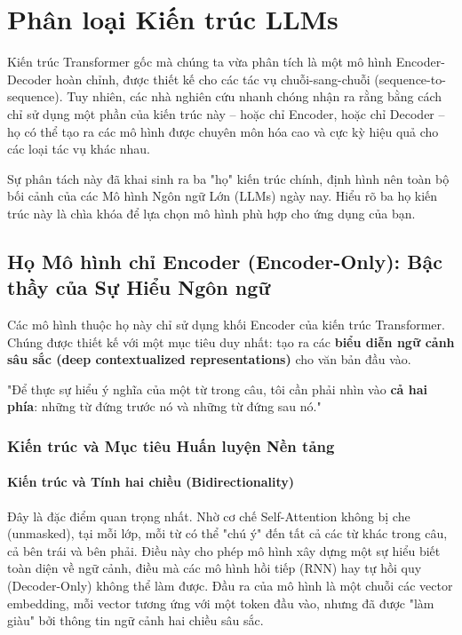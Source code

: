 
\section{Phân loại Kiến trúc LLMs}
\label{sec:llm_architectures_classification}

Kiến trúc Transformer gốc mà chúng ta vừa phân tích là một mô hình Encoder-Decoder hoàn chỉnh, được thiết kế cho các tác vụ chuỗi-sang-chuỗi (sequence-to-sequence). Tuy nhiên, các nhà nghiên cứu nhanh chóng nhận ra rằng bằng cách chỉ sử dụng một phần của kiến trúc này -- hoặc chỉ Encoder, hoặc chỉ Decoder -- họ có thể tạo ra các mô hình được chuyên môn hóa cao và cực kỳ hiệu quả cho các loại tác vụ khác nhau.

Sự phân tách này đã khai sinh ra ba "họ" kiến trúc chính, định hình nên toàn bộ bối cảnh của các Mô hình Ngôn ngữ Lớn (LLMs) ngày nay. Hiểu rõ ba họ kiến trúc này là chìa khóa để lựa chọn mô hình phù hợp cho ứng dụng của bạn.

\subsection{Họ Mô hình chỉ Encoder (Encoder-Only): Bậc thầy của Sự Hiểu Ngôn ngữ}
\label{ssec:encoder_only}

Các mô hình thuộc họ này chỉ sử dụng khối Encoder của kiến trúc Transformer. Chúng được thiết kế với một mục tiêu duy nhất: tạo ra các \textbf{biểu diễn ngữ cảnh sâu sắc (deep contextualized representations)} cho văn bản đầu vào.

\begin{tcolorbox}[
    title=Triết lý của Encoder-Only,
    colback=blue!5!white, colframe=blue!75!black, fonttitle=\bfseries
]
"Để thực sự hiểu ý nghĩa của một từ trong câu, tôi cần phải nhìn vào \textbf{cả hai phía}: những từ đứng trước nó và những từ đứng sau nó."
\end{tcolorbox}

\subsubsection{Kiến trúc và Mục tiêu Huấn luyện Nền tảng}
\paragraph{Kiến trúc và Tính hai chiều (Bidirectionality)}
Đây là đặc điểm quan trọng nhất. Nhờ cơ chế Self-Attention không bị che (unmasked), tại mỗi lớp, mỗi từ có thể "chú ý" đến tất cả các từ khác trong câu, cả bên trái và bên phải. Điều này cho phép mô hình xây dựng một sự hiểu biết toàn diện về ngữ cảnh, điều mà các mô hình hồi tiếp (RNN) hay tự hồi quy (Decoder-Only) không thể làm được. Đầu ra của mô hình là một chuỗi các vector embedding, mỗi vector tương ứng với một token đầu vào, nhưng đã được "làm giàu" bởi thông tin ngữ cảnh hai chiều sâu sắc.

